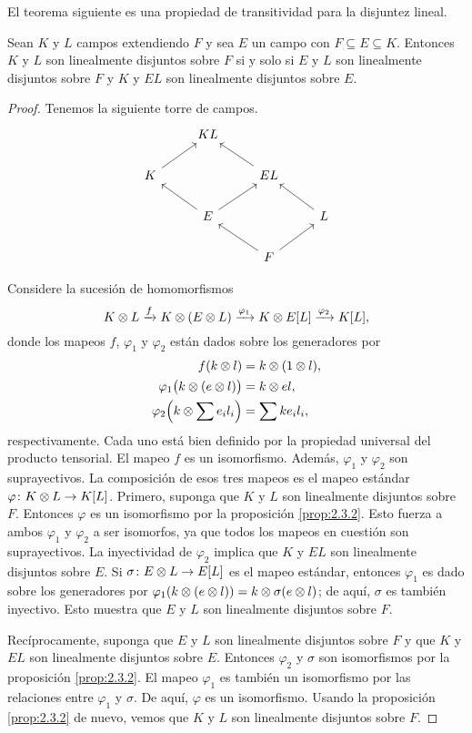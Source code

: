 El teorema siguiente es una propiedad de transitividad para la disjuntez lineal.

\begin{theorem}\label{theo:37}
  Sean $K$ y $L$ campos extendiendo $F$ y sea $E$ un campo con $F\subseteq E\subseteq K$. Entonces $K$ y $L$ son linealmente disjuntos sobre $F$ si y solo si $E$ y $L$ son linealmente disjuntos sobre $F$ y $K$ y $EL$ son linealmente disjuntos sobre $E$.
\end{theorem}
\begin{proof}
  Tenemos la siguiente torre de campos.
  \[
  \begin{tikzcd}
    & KL & & \\
    K \arrow[ru] & & EL \arrow[lu] & \\
    & E \arrow[ru] \arrow[lu] & & L \arrow[lu] \\
    & & F \arrow[lu] \arrow[ru] &             
  \end{tikzcd}
  \]

  Considere la sucesión de homomorfismos
  \[
    K \otimes L \xrightarrow{f} K \otimes (E \otimes L)
      \xrightarrow{\varphi_1} K \otimes E [L]
      \xrightarrow{\varphi_2} K[L],
  \]
  donde los mapeos $f$, $\varphi_1$ y $\varphi_2$ están dados sobre los generadores por
  \begin{align*}
    f(k\otimes l) &= k \otimes (1\otimes l), \\
    \varphi_1 \bigl(k\otimes (e\otimes l)  \bigr) &= k\otimes el,\\
    \varphi_2 \Bigl(k\otimes\sum e_i l_i\Bigr) &= \sum ke_i l_i,
  \end{align*}
  respectivamente. Cada uno está bien definido por la propiedad universal del producto tensorial. El mapeo $f$ es un isomorfismo. Además, $\varphi_1$ y $\varphi_2$ son suprayectivos. La composición de esos tres mapeos es el mapeo estándar $\varphi\colon K \otimes L \to K[L]$. Primero, suponga que $K$ y $L$ son linealmente disjuntos sobre $F$. Entonces $\varphi$ es un isomorfismo por la proposición \ref{prop:2.3.2}. Esto fuerza a ambos $\varphi_1$ y $\varphi_2$ a ser isomorfos, ya que todos los mapeos en cuestión son suprayectivos. La inyectividad de $\varphi_2$ implica que $K$ y $EL$ son linealmente disjuntos sobre $E$. Si $\sigma\colon E\otimes L \to E[L]$ es el mapeo estándar, entonces $\varphi_1$ es dado sobre los generadores por $\varphi_1( k\otimes (e\otimes l)) = k \otimes \sigma(  e\otimes l)  $; de aquí, $\sigma$ es también inyectivo. Esto muestra que $E$ y $L$ son linealmente disjuntos sobre $F$.

  Recíprocamente, suponga que $E$ y $L$ son linealmente disjuntos sobre $F $ y que $K$ y $EL$ son linealmente disjuntos sobre $E$. Entonces $\varphi_2$ y $\sigma$ son isomorfismos por la proposición \ref{prop:2.3.2}. El mapeo $\varphi_1$ es también un isomorfismo por las relaciones entre $\varphi_1$ y $\sigma$. De aquí, $\varphi$ es un isomorfismo. Usando la proposición \ref{prop:2.3.2} de nuevo, vemos que $K$ y $L$ son linealmente disjuntos sobre $F$.
\end{proof}